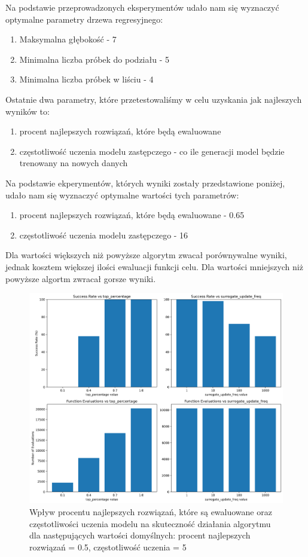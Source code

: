 \documentclass{article}
\begin{document}
Na podstawie przeprowadzonych eksperymentów udało nam się wyznaczyć optymalne parametry drzewa regresyjnego:

\begin{enumerate}
    \item Maksymalna głębokość - 7
    \item Minimalna liczba próbek do podziału - 5
    \item Minimalna liczba próbek w liściu - 4
\end{enumerate}

Ostatnie dwa parametry, które przetestowaliśmy w celu uzyskania jak najleszych wyników to:
\begin{enumerate}
    \item procent najlepszych rozwiązań, które będą ewaluowane
    \item częstotliwość uczenia modelu zastępczego - co ile generacji model będzie trenowany na nowych danych
\end{enumerate}

Na podstawie ekperymentów, których wyniki zostały przedstawione poniżej, udało nam się wyznaczyć optymalne wartości tych parametrów:
\begin{enumerate}
    \item procent najlepszych rozwiązań, które będą ewaluowane - 0.65
    \item częstotliwość uczenia modelu zastępczego - 16
\end{enumerate}

Dla wartości większych niż powyższe algorytm zwacał porównywalne wyniki, jednak kosztem większej ilości ewaluacji funkcji celu. Dla wartości mniejszych niż powyższe algortm zwracał gorsze wyniki.

\begin{figure}[H]
    \centering
    \includegraphics[width=\textwidth]{surrogate_de_parameter_tuning_results1.png}
    \caption{Wpływ procentu najlepszych rozwiązań, które są ewaluowane oraz częstotliwości uczenia modelu na skuteczność działania algorytmu dla następujących wartości domyślnych: procent najlepszych rozwiązań = 0.5, częstotliwość uczenia = 5}
    \label{fig:surogate_de_parameter_results1}
\end{figure}
\end{document}
